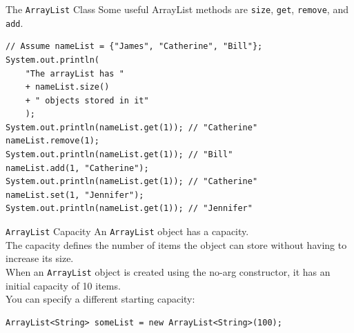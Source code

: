 \documentclass[11pt]{beamer}
\begin{document}
\begin{frame}[fragile]
{The \texttt{ArrayList} Class}
    Some useful ArrayList methods are \texttt{size}, \texttt{get}, \texttt{remove}, and \texttt{add}.
    \begin{lstlisting}[basicstyle=\ttfamily\footnotesize]
// Assume nameList = {"James", "Catherine", "Bill"};
System.out.println(
    "The arrayList has "
    + nameList.size()
    + " objects stored in it"
    );
System.out.println(nameList.get(1)); // "Catherine"
nameList.remove(1);
System.out.println(nameList.get(1)); // "Bill"
nameList.add(1, "Catherine");
System.out.println(nameList.get(1)); // "Catherine"
nameList.set(1, "Jennifer");
System.out.println(nameList.get(1)); // "Jennifer"
    \end{lstlisting}
\end{frame}

\begin{frame}[fragile]
{\texttt{ArrayList} Capacity}
    An \texttt{ArrayList} object has a capacity. \\ \vspace{1em}
    The capacity defines the number of items the object can store without having to increase its size. \\ \vspace{1em}
    When an \texttt{ArrayList} object is created using the no-arg constructor, it has an initial capacity of 10 items. \\ \vspace{1em}
    You can specify a different starting capacity:
    \begin{lstlisting}
ArrayList<String> someList = new ArrayList<String>(100);
    \end{lstlisting}
    
\end{frame}
\end{document}
